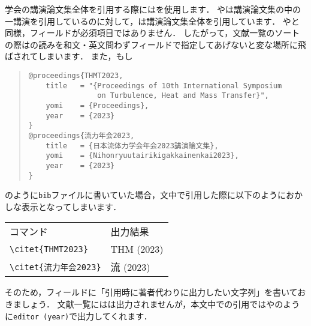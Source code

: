 \documentclass[a4paper,fleqn,uplatex,dvipdfmx]{jsarticle}
\begin{document}
学会の講演論文集全体を引用する際には\ttproceedings を使用します．
\ttconference や\ttinproceedings は講演論文集の中の一講演を引用しているのに対して，\ttproceedings は講演論文集全体を引用しています．
\ttmanual や\ttmisc と同様，\ttauthor フィールドが必須項目ではありません．
したがって，文献一覧のソートの際は\tttitle の読みを和文・英文問わず\ttyomi フィールドで指定してあげないと変な場所に飛ばされてしまいます．
また，もし
\begin{quote}
\begin{verbatim}
@proceedings{THMT2023,
    title   = "{Proceedings of 10th International Symposium 
                on Turbulence, Heat and Mass Transfer}",
    yomi    = {Proceedings},
    year    = {2023}
}
@proceedings{流力年会2023,
    title   = {日本流体力学会年会2023講演論文集},
    yomi    = {Nihonryuutairikigakkainenkai2023},
    year    = {2023}
}
\end{verbatim}
\end{quote}
のように\verb|bib|ファイルに書いていた場合，文中で引用した際に以下のようにおかしな表示となってしまいます．
\begin{table}[h]
    \centering
    \begin{tabular}{ll}
        コマンド    &出力結果 \\
        \verb|\citet{THMT2023}| &THM (2023) \\
        \verb|\citet{流力年会2023}| &流 (2023) \\
    \end{tabular}
\end{table}
そのため，\tteditor フィールドに「引用時に著者代わりに出力したい文字列」を書いておきましょう．
文献一覧には\tteditor は出力されませんが，本文中での引用では\citet{THMT2023}や\citet{流力年会2023}のように\verb|editor (year)|で出力してくれます．
\end{document}
